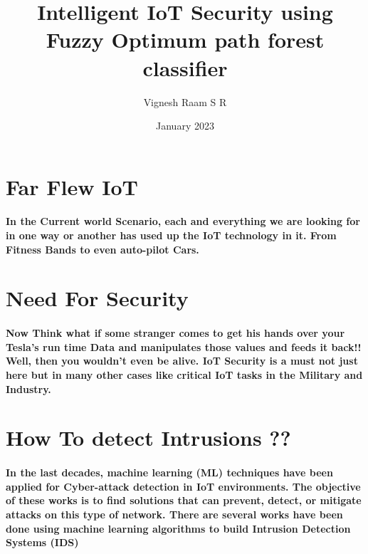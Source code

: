 \documentclass[a4paper,15pt]{article}
\title{Intelligent IoT Security using Fuzzy Optimum path forest classifier}
\author{Vignesh Raam S R }
\date{January 2023}
\begin{document}
\maketitle

\section*{Far Flew IoT}
\paragraph{
    In the Current world Scenario, each and everything we are looking for in one way or another has used up the IoT technology in it. From Fitness Bands to even auto-pilot Cars.
}


\section*{Need For Security}
\paragraph{
Now Think what if some stranger comes to get his hands over your Tesla's run time Data and manipulates those values and feeds it back!! Well, then you wouldn't even be alive. IoT Security is a must not just here but in many other cases like critical IoT tasks in the Military and Industry.
}


\section*{How To detect Intrusions ??}
\paragraph{
In the last decades, machine learning (ML) techniques have
been applied for Cyber-attack detection in IoT environments.
The objective of these works is to find solutions that
can prevent, detect, or mitigate attacks on this type of network.
There are several works have been done using machine learning algorithms
to build Intrusion Detection Systems (IDS)
}
\end{document}
